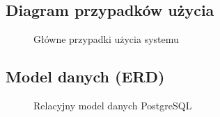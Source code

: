 \subsection{Diagram przypadków użycia}
\begin{figure}[H]
  \centering
  \resizebox{0.95\textwidth}{!}{}
  \caption{Główne przypadki użycia systemu}
\end{figure}

\subsection{Model danych (ERD)}
\begin{figure}[H]
  \centering
  \resizebox{0.98\textwidth}{!}{}
  \caption{Relacyjny model danych PostgreSQL}
\end{figure}
